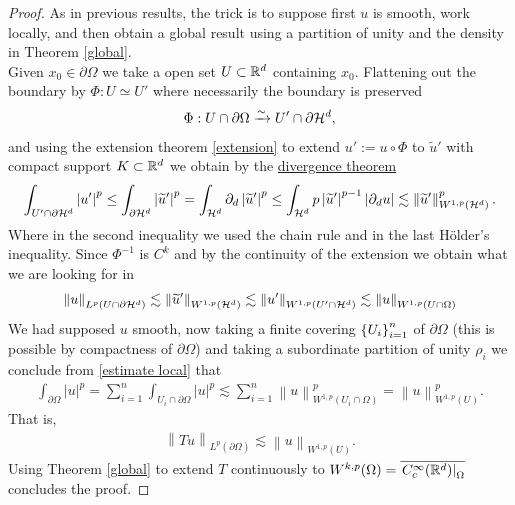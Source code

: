 \documentclass[12pt]{article}
\theoremstyle{remark}
\renewcommand{\norm}[1]{\left\lVert #1 \right\rVert}\renewcommand{\abs}[1]{\left| #1 \right|}
\newcommand{\iso}{\xrightarrow{\sim}}
\newcommand\restr[2]{\left.#1\right|_{#2}}
\begin{document}
\begin{proof}
	As in previous results, the trick is to suppose first $u$ is smooth, work locally, and then obtain a global result using a partition of unity and the density in Theorem \ref{global}. \\

	Given $x_0 \in \partial  \Omega$ we take a open set $U \subset \mathbb{R}^d$ containing $x_0$. Flattening out the boundary by $\Phi : U \simeq U'$ where necessarily the boundary is preserved
	\begin{align*}
		\Phi: U \cap  \partial \Omega\iso U' \cap \partial  \Hh^d,
	\end{align*}
	and using the extension theorem \ref{extension} to extend $u':= u\circ \Phi$ to $\widetilde{u}'$ with compact support $K \subset \mathbb{R}^d $  we obtain by the \href{https://en.wikipedia.org/wiki/Divergence_theorem#:~:text=space%5Bedit%5D-,We,-are%20going%20to%20prove}{divergence theorem}
	\begin{align*}
		\int_{U'\cap \partial \Hh^d}\abs{u'}^p  \leq\int_{\partial \Hh^d} \abs{\widetilde{u}'}^p=\int_{\Hh^d} \partial_{d} \abs{\widetilde{u}'}^p\leq\int_{\Hh^d} p\abs{\widetilde{u}'}^{p-1}\abs{\partial_{d} u}   \lesssim \norm{\widetilde{u}'}_{W^{1,p}(\Hh^d)}^p  .
	\end{align*}
	Where in the second inequality we used the chain rule and in the last Hölder's inequality.
	Since $\Phi^{-1}$ is $C^k$ and by the continuity of the extension we obtain what we are looking for in
	\begin{align}\label{estimate local}
		\norm{u}_{L^p(U \cap \partial \Hh^d)}\lesssim \norm{\widetilde{u}'}_{W^{1,p}(\Hh^d)}\lesssim \norm{u'}_{W^{1,p}(U'\cap \Hh^d)}\lesssim  \norm{u}_{W^{1,p}(U\cap \Omega)}
	\end{align}
	We had supposed $u$ smooth, now taking a finite covering $\left\{U_i\right\}_{i=1}^n $ of $\partial  \Omega$ (this is possible by compactness of $\partial  \Omega$) and taking a subordinate partition of unity  $\rho _i$ we conclude from \eqref{estimate local}  that
	\begin{align*}
		\int_{\partial \Omega} \abs{u}^p  =\sum_{i=1}^n \int_{ U_i \cap \partial \Omega} \abs{u}^p \lesssim \sum_{i=1}^n \norm{u}_{W^{1,p}(U_i \cap \Omega)}^p =\norm{u}_{W^{1,p}(U)}^p .
	\end{align*}
	That is,
	\begin{align*}
		\norm{T u}_{L^p( \partial \Omega)}\lesssim  \norm{u}_{W^{1,p}(U)} .
	\end{align*}
	Using Theorem \ref{global} to extend $T$ continuously to $W^{k,p}(\Omega)= \overline{\restr{C_c^\infty(\R^d)}{\Omega}}$ concludes the proof.
\end{proof}
\end{document}

